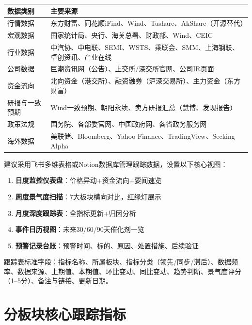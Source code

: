 \begin{exhibitbox}[表9-3：核心数据来源一览]
\scriptsize
\setlength{\tabcolsep}{3pt}
\renewcommand{\arraystretch}{1.12}
\begin{tabularx}{\textwidth}{l X}
\toprule
\textbf{数据类别} & \textbf{主要来源} \\
\midrule
行情数据 & 东方财富、同花顺iFind、Wind、Tushare、AkShare（开源替代） \\
宏观数据 & 国家统计局、央行、海关总署、财政部、Wind、CEIC \\
行业数据 & 中汽协、中电联、SEMI、WSTS、乘联会、SMM、上海钢联、卓创资讯、产业在线 \\
公司数据 & 巨潮资讯网（公告）、上交所/深交所官网、公司IR页面 \\
资金流向 & 北向资金（港交所）、融资融券（沪深交易所）、主力资金（东方财富） \\
研报与一致预期 & Wind一致预期、朝阳永续、卖方研报汇总（慧博、发现报告） \\
政策法规 & 国务院、各部委官网、中国政府网、各省政务服务网 \\
海外数据 & 美联储、Bloomberg、Yahoo Finance、TradingView、Seeking Alpha \\
\bottomrule
\end{tabularx}
\end{exhibitbox}

\begin{keyinsight}[跟踪管理工具建议]
建议采用飞书多维表格或Notion数据库管理跟踪数据，设置以下核心视图：
\begin{enumerate}[leftmargin=1.8em]
\item \textbf{日度监控仪表盘}：价格异动+资金流向+要闻速览
\item \textbf{周度景气度扫描}：7大板块横向对比，红绿灯展示
\item \textbf{月度深度跟踪表}：全指标更新+归因分析
\item \textbf{事件日历视图}：未来30/60/90天催化剂一览
\item \textbf{预警记录台账}：预警时间、标的、原因、处置措施、后续验证
\end{enumerate}
跟踪表标准字段：指标名称、所属板块、指标分类（领先/同步/滞后）、数据频率、数据来源、上期值、本期值、环比变动、同比变动、趋势判断、景气度评分（1--5分）、备注与链接、更新日期。
\end{keyinsight}

\section{分板块核心跟踪指标}

